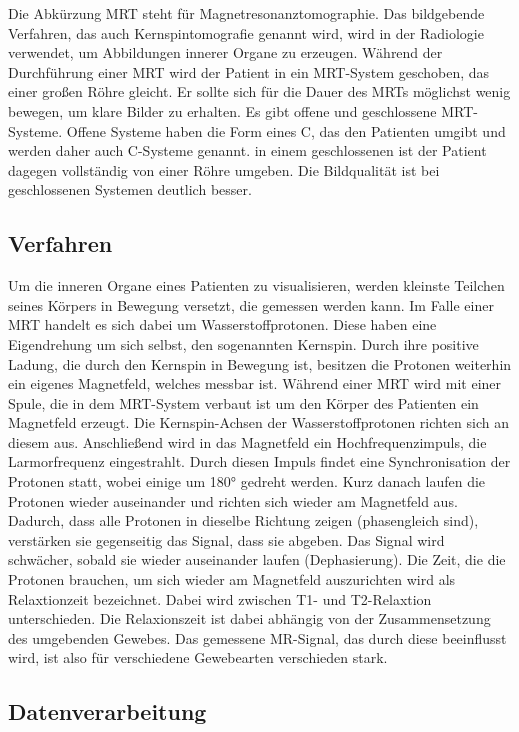 Die Abkürzung MRT steht für Magnetresonanztomographie. Das bildgebende Verfahren, das auch Kernspintomografie genannt wird, wird in der Radiologie verwendet, um Abbildungen innerer Organe zu erzeugen. Während der Durchführung einer MRT wird der Patient in ein MRT-System geschoben, das einer großen Röhre gleicht. Er sollte sich für die Dauer des MRTs möglichst wenig bewegen, um klare Bilder zu erhalten.
Es gibt offene und geschlossene MRT-Systeme. Offene Systeme haben die Form eines C, das den Patienten umgibt und werden daher auch C-Systeme genannt. in einem geschlossenen ist der Patient dagegen vollständig von einer Röhre umgeben. Die Bildqualität ist bei geschlossenen Systemen deutlich besser.
 	
\subsection{Verfahren}

Um die inneren Organe eines Patienten zu visualisieren, werden kleinste Teilchen seines Körpers in Bewegung versetzt, die gemessen werden kann. Im Falle einer MRT handelt es sich dabei um Wasserstoffprotonen. Diese haben eine Eigendrehung um sich selbst, den sogenannten Kernspin. Durch ihre positive Ladung, die durch den Kernspin in Bewegung ist, besitzen die Protonen weiterhin ein eigenes Magnetfeld, welches messbar ist. 
Während einer MRT wird mit einer Spule, die in dem MRT-System verbaut ist um den Körper des Patienten ein Magnetfeld erzeugt. Die Kernspin-Achsen der Wasserstoffprotonen richten sich an diesem aus. Anschließend wird in das Magnetfeld ein Hochfrequenzimpuls, die Larmorfrequenz eingestrahlt. Durch diesen Impuls findet eine Synchronisation der Protonen statt, wobei einige um 180° gedreht werden. Kurz danach laufen die Protonen wieder auseinander und richten sich wieder am Magnetfeld aus. 
Dadurch, dass alle Protonen in dieselbe Richtung zeigen (phasengleich sind), verstärken sie gegenseitig das Signal, dass sie abgeben. Das Signal wird schwächer, sobald sie wieder auseinander laufen (Dephasierung).
Die Zeit, die die Protonen brauchen, um sich wieder am Magnetfeld auszurichten wird als Relaxtionzeit bezeichnet. Dabei wird zwischen T1- und T2-Relaxtion unterschieden.
Die Relaxionszeit ist dabei abhängig von der Zusammensetzung des umgebenden Gewebes. Das gemessene MR-Signal, das durch diese beeinflusst wird, ist also für verschiedene Gewebearten verschieden stark.
\cite{weishaupt09}

\subsection{Datenverarbeitung}

